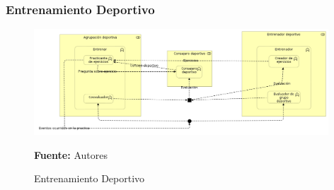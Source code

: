 \subsubsection{Entrenamiento Deportivo}

\begin{figure}[!htb]
  \begin{center}
    \includegraphics[width=11cm]{./imagenes/business_functions/entrenamientodeportivo.png}
    \caption{Entrenamiento Deportivo}
    \label{fig:bf_entrenamiento_deportivo}
    \textbf{Fuente:}  Autores
  \end{center}
\end{figure}

